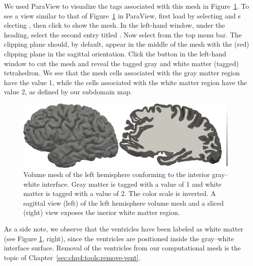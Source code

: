 We used ParaView to visualize the tags associated with this mesh
in Figure~\ref{fig:chp4:ernie-tagged-twodomain-mesh}.  To see a view similar 
to that of Figure~\ref{fig:chp4:ernie-tagged-twodomain-mesh} in ParaView, first 
load  by selecting  and s
electing , then click  to show the mesh.  In 
the left-hand window, under the  heading, select the second 
entry titled .  Now select 
 from the top menu 
bar.  The clipping plane should, by default, appear in the middle of the mesh 
with the (red) clipping plane in the sagittal orientation.  Click the 
 button in the left-hand window to cut the mesh and reveal the 
tagged gray and white matter (tagged) tetrahedron.  We see that the
mesh cells associated with the gray matter region have the value 1,
while the cells associated with the white matter region have the value
2, as defined by our subdomain map.

\begin{figure}
  \includegraphics[width=0.99\textwidth]{./graphics/chp4/two-domain-tagged-bw.png}
  \caption{Volume mesh of the left hemisphere conforming to the
    interior gray--white interface.  Gray matter is tagged with a value of 1 
    and white matter is tagged with a value of 2.  The color scale is inverted. 
    A sagittal view (left) of the left hemisphere volume mesh and a sliced 
    (right) view exposes the inerior white matter region.}
  \label{fig:chp4:ernie-tagged-twodomain-mesh}
\end{figure}

As a side note, we observe that the ventricles have been labeled as
white matter (see Figure \ref{fig:chp4:ernie-tagged-twodomain-mesh},
right), since the ventricles are positioned inside the gray--white
interface surface. Removal of the ventricles from our computational mesh
is the topic of Chapter~\ref{sec:chp4:tools:remove-vent}.

